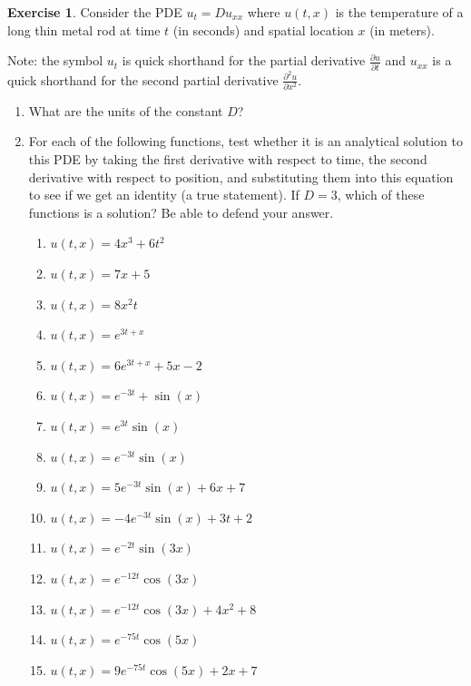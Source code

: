 \documentclass[
]{book}
\providecommand{\tightlist}{%
  \setlength{\itemsep}{0pt}\setlength{\parskip}{0pt}}
\theoremstyle{definition}
\theoremstyle{definition}
\theoremstyle{definition}
\newtheorem{exercise}{Exercise}[chapter]
\theoremstyle{remark}
\begin{document}
\begin{exercise}
\protect\hypertarget{exr:unnamed-chunk-511}{}{\label{exr:unnamed-chunk-511} }Consider the PDE \(u_t = D u_{xx}\) where \(u(t,x)\) is the temperature of a long thin metal rod at time \(t\) (in seconds) and spatial location \(x\) (in meters).

Note: the symbol \(u_t\) is quick shorthand for the partial derivative \(\frac{\partial u}{\partial t}\) and \(u_{xx}\) is a quick shorthand for the second partial derivative \(\frac{\partial^2 u}{\partial x^2}\).

\begin{enumerate}
\def\labelenumi{\alph{enumi}.}
\tightlist
\item
  What are the units of the constant \(D\)?
\item
  For each of the following functions, test whether it is an analytical solution to this PDE by taking the first derivative with respect to time, the second derivative with respect to position, and substituting them into this equation to see if we get an identity (a true statement). If \(D = 3\), which of these functions is a solution? Be able to defend your answer.

  \begin{enumerate}
  \def\labelenumii{\roman{enumii}.}
  \tightlist
  \item
    \(u(t,x) = 4 x^3 + 6 t^2\)
  \item
    \(u(t,x) = 7 x + 5\)
  \item
    \(u(t,x) = 8 x^2 t\)
  \item
    \(u(t,x) = e^{3 t + x}\)
  \item
    \(u(t,x) = 6 e^{3 t + x} +5x - 2\)
  \item
    \(u(t,x) = e^{-3t} + \sin (x)\)
  \item
    \(u(t,x) = e^{3t} \sin (x)\)
  \item
    \(u(t,x) = e^{-3t} \sin (x)\)
  \item
    \(u(t,x) = 5 e^{-3t} \sin (x) + 6x + 7\)
  \item
    \(u(t,x) = -4 e^{-3t} \sin (x) + 3t + 2\)
  \item
    \(u(t,x) = e^{-2t} \sin (3x)\)
  \item
    \(u(t,x) = e^{-12 t} \cos (3x)\)
  \item
    \(u(t,x) = e^{-12 t} \cos (3x)+4x^2 + 8\)
  \item
    \(u(t,x) = e^{-75 t} \cos (5x)\)
  \item
    \(u(t,x) = 9 e^{-75 t} \cos (5x) + 2 x + 7\)
  \end{enumerate}
\end{enumerate}
\end{exercise}
\end{document}

